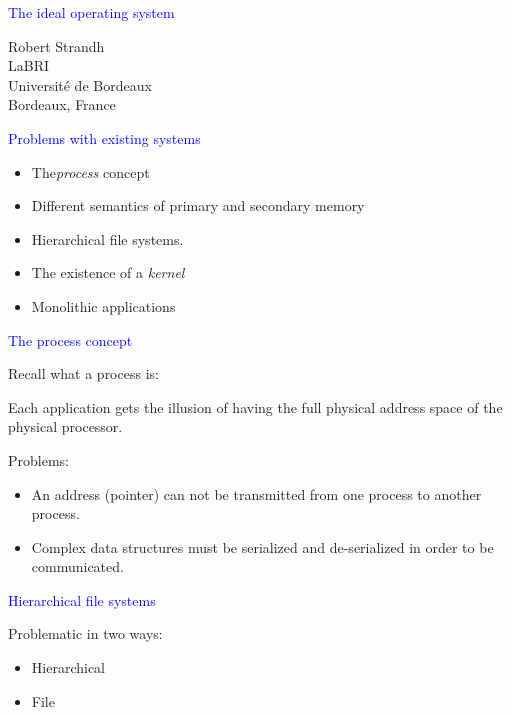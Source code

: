 \documentclass{slides}
\newcommand{\ti}[1]{\begin{center}\Large{\textcolor{blue}{#1}}\end{center}}
\begin{document}
\landscape
\setlength{\oddsidemargin}{1cm}
\setlength{\evensidemargin}{1cm}
\setlength{\marginparwidth}{1cm}
\setlength{\parskip}{0.5cm}
\setlength{\parindent}{0cm}
\begin{slide}\ti{The ideal operating system}
\vskip 0.5cm
\begin{center}
Robert Strandh \\
LaBRI \\
Université de Bordeaux \\
Bordeaux, France
\end{center}
\vfill\end{slide}
\begin{slide}\ti{Problems with existing systems}
\vskip 0.5cm
\begin{itemize}
\item The\emph{process} concept
\item Different semantics of primary and secondary memory
\item Hierarchical file systems. 
\item The existence of a \emph{kernel}
\item Monolithic applications
\end{itemize}
\vfill\end{slide}
\begin{slide}\ti{The process concept}
\vskip 0.5cm
Recall what a process is:

Each application gets the illusion of having the full physical address
space of the physical processor.  

Problems:
\begin{itemize}
\item An address (pointer) can not be transmitted from one process to
  another process.
\item Complex data structures must be serialized and de-serialized in
  order to be communicated.
\end{itemize}
\vfill\end{slide}
\begin{slide}\ti{Hierarchical file systems}
\vskip 0.5cm
Problematic in two ways:

\begin{itemize}
\item Hierarchical
\item File
\end{itemize}

\vfill\end{slide}
\end{document}
